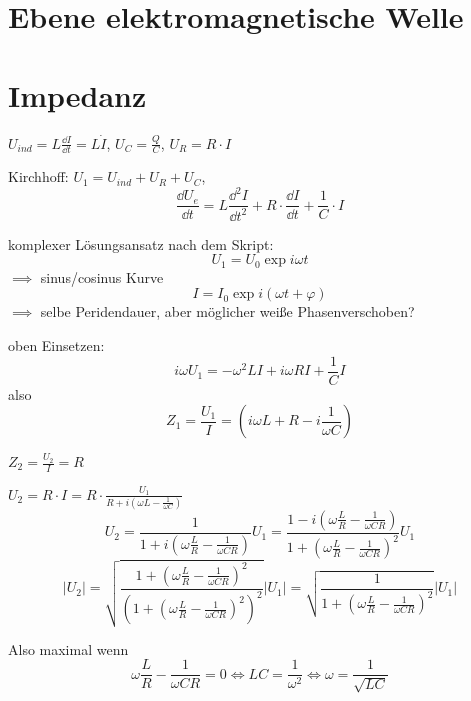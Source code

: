 \documentclass[sectionformat=aufgabe]{gadsescript}
\begin{document}
\maketitle

\section{Ebene elektromagnetische Welle}

\section{Impedanz}
$ U_{ind} = L \frac{ \dd I }{ \dd t } = L \dot I $, $ U_C = \frac{ Q }{ C }  $, $ U_R = R \cdot I $

Kirchhoff: $ U_1 = U_{ind} + U_{R} + U_{C} $,
\[
	\frac{ \dd U_e }{ \dd t } = L \frac{ \dd ^2 I }{ \dd t^2 } + R \cdot \frac{ \dd I }{ \dd t }  + \frac{ 1 }{ C } \cdot I
\]

komplexer Lösungsansatz nach dem Skript:
\[
	U_1 = U_0 \exp i \omega t 
\]
$ \implies  $ sinus/cosinus Kurve
\[
	I = I_0 \exp i ( \omega t + \varphi )
\]
$ \implies  $ selbe Peridendauer, aber möglicher weiße Phasenverschoben?

oben Einsetzen:
\[
	i \omega U_1 = - \omega ^2 L I + i \omega R I + \frac{ 1 }{ C } I
\]
also
\[
	Z_1 = \frac{U_1}{ I }  = \left( i \omega L + R - i\frac{ 1 }{ \omega C } \right)
\]

$ Z_2 = \frac{ U_2 }{ I } = R  $


$ U_2 = R \cdot I = R \cdot \frac{ U_1 }{ R + i\left( \omega L - \frac{ 1 }{ \omega C }  \right)  }  $
\[
 	U_2 = \frac{ 1 }{ 1 + i \left( \omega \frac{ L }{ R } - \frac{ 1 }{ \omega CR }  \right)  } U_1
	= \frac{ 1 - i \left( \omega \frac{ L }{ R } - \frac{ 1 }{ \omega CR }  \right) }{ 1 + \left( \omega \frac{ L }{ R } - \frac{ 1 }{ \omega CR }  \right) ^2 } U_1
\]
\[
	\left| U_2 \right| = \sqrt{\frac{ 1 + \left( \omega \frac{ L }{ R } - \frac{ 1 }{ \omega CR }  \right) ^2 }{ \left( 1 + \left( \omega \frac{ L }{ R } - \frac{ 1 }{ \omega CR }  \right) ^2 \right) ^2 }} \left| U_1 \right| = \sqrt{\frac{ 1 }{ 1 + \left( \omega \frac{ L }{ R } - \frac{ 1 }{ \omega C R }  \right) ^2 } } \left| U_1 \right| 
\]

Also maximal wenn
\[
	\omega \frac{ L }{ R } - \frac{ 1 }{ \omega C R } = 0 \iff LC = \frac{ 1 }{ \omega^2 } \iff \omega = \frac{ 1 }{ \sqrt{LC}  } 
\]
\end{document}
